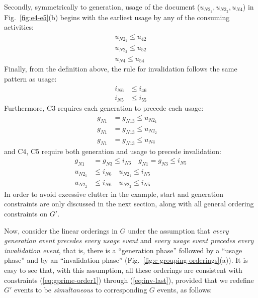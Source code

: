 Secondly, symmetrically to generation, usage of the document ($u_{N2_1}, u_{N2_2}, u_{N4}$) in Fig.~\ref{fig:e4-e5}(b) begins with the earliest usage by any of the consuming activities:
\begin{align}
u_{N2_1} \leq u_{42} \label{eq:gen-usage1}\\
u_{N2_2} \leq u_{52}  \label{eq:gen-usage2}\\
u_{N4} \leq u_{54}  \label{eq:gen-usage3}
\end{align}
%
Finally, from the definition above, the rule for invalidation follows the same pattern as usage:
%
\begin{align}
i_{N6} &\leq i_{46} \label{eq:inv1}\\
i_{N5} &\leq i_{55}  \label{eq:inv2}
\end{align}
%
Furthermore, C3 requires each generation to precede each usage:
%
\begin{align}
g_{N1} &= g_{N13}  \leq  u_{N2_1}  \quad  \\
g_{N1} &= g_{N13}  \leq  u_{N2_2}  \quad  \\
g_{N1} &= g_{N13}  \leq  u_{N4}  \label{eq:gprime-order2}
\end{align}
%
and C4, C5 require both generation and usage to precede invalidation:
%
\begin{align}
g_{N1} &= g_{N3} \leq i_{N6}  \quad g_{N1} = g_{N3} \leq i_{N5} \\
u_{N2_1} &\leq i_{N6}  \quad u_{N2_1} \leq i_{N5} \\
u_{N2_2} &\leq i_{N6}  \quad u_{N2_2} \leq i_{N5} \label{eq:inv-last}
\end{align}
%
In order to avoid excessive clutter in the example, start and generation constraints are only discussed in the next section, along with all general ordering constraints on $G'$.


Now, consider the  linear orderings in $G$ under the assumption that \textit{every generation event precedes every usage event} and \textit{every usage event precedes every invalidation event}, that is, there is a ``generation phase'' followed by a ``usage phase'' and by an ``invalidation phase'' (Fig.~\ref{fig:e-grouping-orderings}(a)). It is easy to see that, with this assumption, all these orderings are consistent with constraints (\ref{eq:gprime-order1}) through (\ref{eq:inv-last}), provided that we redefine $G'$ events to be \textit{simultaneous} to corresponding $G$ events, as follows:

